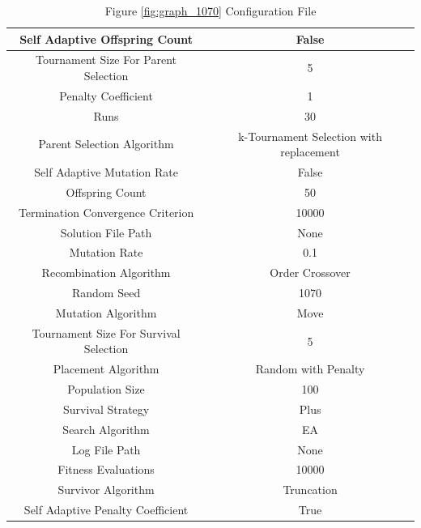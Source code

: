 \documentclass{standalone}
\begin{document}
\begin{table}[!htb]
	\centering
	\caption{Figure \ref{fig:graph_1070} Configuration File}
	\label{tab:graph_1070}
	\begin{tabular}{| c | c |}
		\hline
		Self Adaptive Offspring Count		& False		 \\
		\hline
		Tournament Size For Parent Selection		& 5		 \\
		\hline
		Penalty Coefficient		& 1		 \\
		\hline
		Runs		& 30		 \\
		\hline
		Parent Selection Algorithm		& k-Tournament Selection with replacement		 \\
		\hline
		Self Adaptive Mutation Rate		& False		 \\
		\hline
		Offspring Count		& 50		 \\
		\hline
		Termination Convergence Criterion		& 10000		 \\
		\hline
		Solution File Path		& None		 \\
		\hline
		Mutation Rate		& 0.1		 \\
		\hline
		Recombination Algorithm		& Order Crossover		 \\
		\hline
		Random Seed		& 1070		 \\
		\hline
		Mutation Algorithm		& Move		 \\
		\hline
		Tournament Size For Survival Selection		& 5		 \\
		\hline
		Placement Algorithm		& Random with Penalty		 \\
		\hline
		Population Size		& 100		 \\
		\hline
		Survival Strategy		& Plus		 \\
		\hline
		Search Algorithm		& EA		 \\
		\hline
		Log File Path		& None		 \\
		\hline
		Fitness Evaluations		& 10000		 \\
		\hline
		Survivor Algorithm		& Truncation		 \\
		\hline
		Self Adaptive Penalty Coefficient		& True		 \\
		\hline
	\end{tabular}
\end{table}
\end{document}
